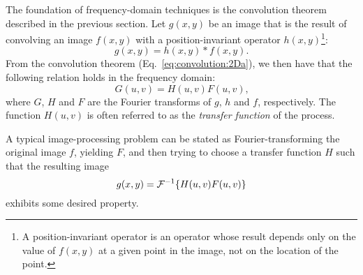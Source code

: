 The foundation of frequency-domain techniques is the convolution
theorem described in the previous section.  Let $g(x,y)$ be an image
that is the result of convolving an image $f(x,y)$ with a
position-invariant operator $h(x,y)$\footnote{A position-invariant
  operator is an operator whose result depends only on the value of
  $f(x,y)$ at a given point in the image, not on the location of the
  point.}:
\begin{equation}
  g(x,y)=h(x,y)\ast f(x,y)\mbox{.}
\end{equation}
From the convolution theorem (Eq.~\ref{eq:convolution:2Da}), we then
have that the following relation holds in the frequency domain:
\begin{equation}
  G(u,v)=H(u,v)F(u,v)\mbox{,}
\end{equation}
where $G$, $H$ and $F$ are the Fourier transforms of $g$, $h$ and $f$,
respectively.  The function $H(u,v)$ is often referred to as the {\em
  transfer function\/} of the process.

A typical image-processing problem can be stated as
Fourier-transforming the original image $f$, yielding $F$, and then
trying to choose a transfer function $H$ such that the resulting image
\begin{equation}
  g(x,y)={\cal F}^{-1}\{H(u,v)F(u,v)\}
\end{equation}
exhibits some desired property.
